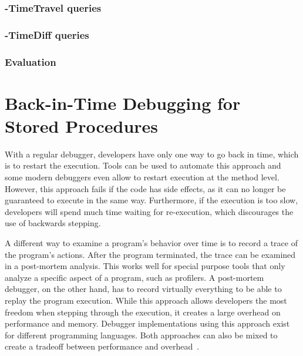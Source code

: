 \subsubsection{-TimeTravel queries}

\subsubsection{-TimeDiff queries}

\subsubsection{Evaluation}

\section{Back-in-Time Debugging for Stored Procedures}


With a regular debugger, developers have only one way to go back in time, which is to restart the execution.
Tools can be used to automate this approach and some modern debuggers even allow to restart execution at the method level.
However, this approach fails if the code has side effects, as it can no longer be guaranteed to execute in the same way.
Furthermore, if the execution is too slow, developers will spend much time waiting for re-execution, which discourages the use of backwards stepping.

A different way to examine a program's behavior over time is to record a trace of the program's actions.
After the program terminated, the trace can be examined in a post-mortem analysis.
This works well for special purpose tools that only analyze a specific aspect of a program, such as profilers.
A post-mortem debugger, on the other hand, has to record virtually everything to be able to replay the program execution.
While this approach allows developers the most freedom when stepping through the execution, it creates a large overhead on performance and memory.
Debugger implementations using this approach exist for different programming languages.
%
Both approaches can also be mixed to create a tradeoff between performance and overhead~\cite{perscheid13:test-driven_fault_navigation}.

